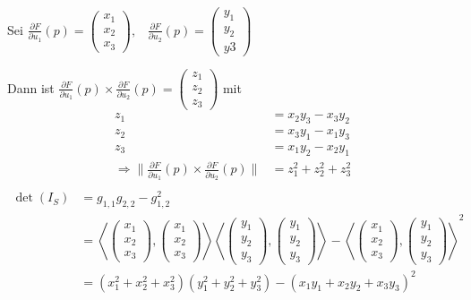 \begin{beweis}\leavevmode
    Sei $\frac{\partial F}{\partial u_1}(p) = \begin{pmatrix}
        x_1\\ x_2 \\ x_3
    \end{pmatrix}, \;\;\; \frac{\partial F}{\partial u_2}(p) = \begin{pmatrix}
        y_1\\ y_2 \\ y3
    \end{pmatrix}$

    Dann ist $\frac{\partial F}{\partial u_1}(p) \times \frac{\partial F}{\partial u_2}(p) = \begin{pmatrix}
        z_1 \\ z_2 \\ z_3
    \end{pmatrix}$ mit
    \begin{align*}
        z_1 &= x_2 y_3 - x_3 y_2\\
        z_2 &= x_3 y_1 - x_1 y_3\\
        z_3 &= x_1 y_2 - x_2 y_1\\
    \Rightarrow \|\frac{\partial F}{\partial u_1} (p) \times \frac{\partial F}{\partial u_2} (p)\| &= z_1^2 + z_2^2 + z_3^2\\
    \end{align*}
    \begin{align*}
        \det(I_S) &= g_{1,1} g_{2,2} - g_{1,2}^2\\
        &= \left \langle \begin{pmatrix} x_1 \\ x_2 \\ x_3 \end{pmatrix}, \begin{pmatrix} x_1 \\ x_2 \\ x_3 \end{pmatrix} \right \rangle \left \langle \begin{pmatrix} y_1 \\ y_2 \\ y_3 \end{pmatrix}, \begin{pmatrix} y_1 \\ y_2 \\ y_3 \end{pmatrix} \right \rangle - \left \langle \begin{pmatrix} x_1 \\ x_2 \\ x_3 \end{pmatrix}, \begin{pmatrix} y_1 \\ y_2 \\ y_3 \end{pmatrix} \right \rangle^2\\
        &= (x_1^2 + x_2^2 + x_3^2) (y_1^2 + y_2^2 + y_3^2) - (x_1 y_1 + x_2 y_2 + x_3 y_3)^2
    \end{align*}
\end{beweis}

